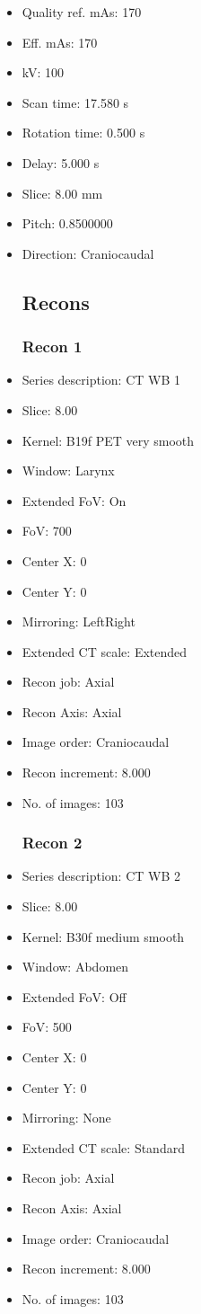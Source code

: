 \documentclass[12pt]{article}
\begin{document}
\begin{itemize}[noitemsep]
\subsection{Scan}
\item Quality ref. mAs: 170\item Eff. mAs: 170\item kV: 100\item Scan time: 17.580 s\item Rotation time: 0.500 s\item Delay: 5.000 s\item Slice: 8.00 mm\item Pitch: 0.8500000\item Direction: Craniocaudal\subsection{Recons}

\subsubsection{Recon 1}
\item Series description: CT WB 1
\item Slice: 8.00
\item Kernel: B19f PET very smooth
\item Window: Larynx
\item Extended FoV: On
\item FoV: 700
\item Center X: 0
\item Center Y: 0
\item Mirroring: LeftRight
\item Extended CT scale: Extended
\item Recon job: Axial
\item Recon Axis: Axial
\item Image order: Craniocaudal
\item Recon increment: 8.000
\item No. of images: 103
\subsubsection{Recon 2}
\item Series description: CT WB 2
\item Slice: 8.00
\item Kernel: B30f medium smooth
\item Window: Abdomen
\item Extended FoV: Off
\item FoV: 500
\item Center X: 0
\item Center Y: 0
\item Mirroring: None
\item Extended CT scale: Standard
\item Recon job: Axial
\item Recon Axis: Axial
\item Image order: Craniocaudal
\item Recon increment: 8.000
\item No. of images: 103

\end{itemize}
\end{document}
